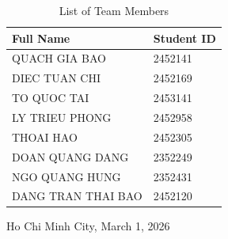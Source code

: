 \documentclass[12pt]{article}
\begin{document}
\begin{titlepage}
\begin{table}[h!]
  \centering
  \begin{tabular}{ll}
    \hline
    \textbf{Full Name} & \textbf{Student ID} \\
    \hline
    QUACH GIA BAO      & 2452141 \\
    DIEC TUAN CHI     & 2452169 \\
    TO QUOC TAI   & 2453141\\
    LY TRIEU PHONG & 2452958\\
    THOAI HAO & 2452305\\
    DOAN QUANG DANG & 2352249\\
    NGO QUANG HUNG & 2352431\\
    DANG TRAN THAI BAO & 2452120\\
    \hline
  \end{tabular}
  \caption{List of Team Members}
  \label{tab:students}
\end{table}
  {\footnotesize Ho Chi Minh City, March 1, 2026}
\end{titlepage}


\newpage
\tableofcontents

\newpage
{}






\newpage


\newpage
\end{document}
